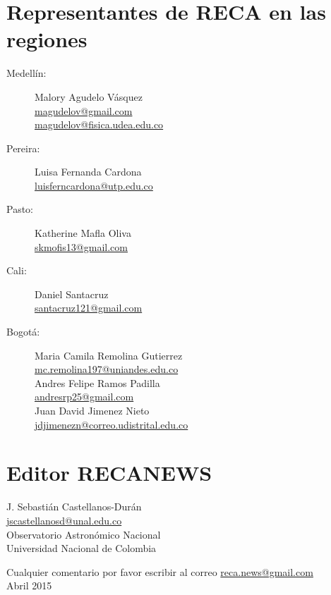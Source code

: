 \documentclass{book}
\begin{document}
\section*{Representantes de RECA en las regiones}
\begin{description}
\item[Medellín:]Malory Agudelo Vásquez\\
\url{magudelov@gmail.com}\\ \url{magudelov@fisica.udea.edu.co}
\item[Pereira:]Luisa Fernanda Cardona\\ \url{luisferncardona@utp.edu.co}
\item[Pasto:]Katherine Mafla Oliva\\
\url{skmofis13@gmail.com}
\item[Cali:]Daniel Santacruz\\
\url{santacruz121@gmail.com}
\item[Bogotá:]Maria Camila Remolina Gutierrez\\
\url{mc.remolina197@uniandes.edu.co}\\

Andres Felipe Ramos Padilla\\
\url{andresrp25@gmail.com}\\

Juan David Jimenez Nieto\\
\url{jdjimenezn@correo.udistrital.edu.co}
\end{description}


			\section*{Editor RECANEWS}
  
\begin{flushright}
J. Sebastián Castellanos-Durán\\
\url{jscastellanosd@unal.edu.co}\\
Observatorio Astronómico Nacional\\
Universidad Nacional de Colombia
\end{flushright}
\begin{flushright}
Cualquier comentario por favor escribir al correo  \url{reca.news@gmail.com}\\
Abril 2015
\end{flushright}
\end{document}

